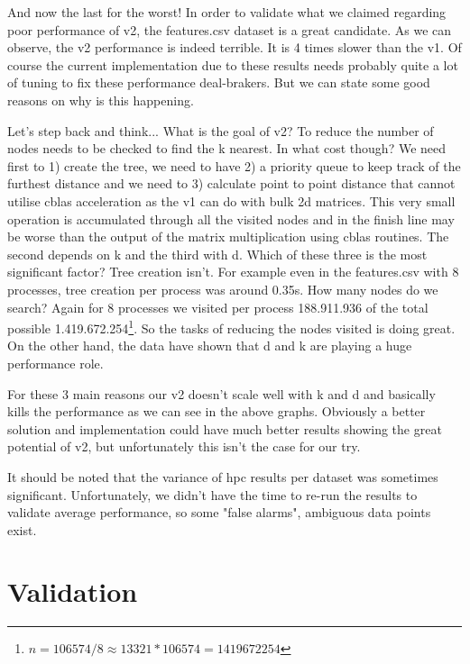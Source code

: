 \documentclass[12pt, a4paper]{article}
\begin{document}
And now the last for the worst! In order to validate what we claimed regarding poor performance of v2, the features.csv dataset is a great candidate. As we can observe, the v2 performance is indeed terrible. It is 4 times slower than the v1. Of course the current implementation due to these results needs probably quite a lot of tuning to fix these performance deal-brakers. But we can state some good reasons on why is this happening. 


Let's step back and think... What is the goal of v2? To reduce the number of nodes needs to be checked to find the k nearest. In what cost though? We need first to 1) create the tree, we need to have 2) a priority queue to keep track of the furthest distance and we need to 3) calculate point to point distance that cannot utilise cblas acceleration as the v1 can do with bulk 2d matrices. This very small operation is accumulated through all the visited nodes and in the finish line may be worse than the output of the matrix multiplication using cblas routines. The second depends on k and the third with d. Which of these three is the most significant factor? Tree creation isn't. For example even in the features.csv with 8 processes, tree creation per process was around 0.35s. How many nodes do we search? Again for 8 processes we visited per process 188.911.936 of the total possible 1.419.672.254\footnote{$ n = 106574 / 8 \approx 13321 * 106574 = 1419672254$}. So the tasks of reducing the nodes visited is doing great. On the other hand, the data have shown that d and k are playing a huge performance role. 

For these 3 main reasons our v2 doesn't scale well with k and d and basically kills the performance as we can see in the above graphs. Obviously a better solution and implementation could have much better results showing the great potential of v2, but unfortunately this isn't the case for our try.



\vspace{0.5cm}
It should be noted that the variance of hpc results per dataset was sometimes significant. Unfortunately, we didn't have the time to re-run the results to validate  average performance, so some "false alarms", ambiguous data points exist.

\section{Validation}
\end{document}
